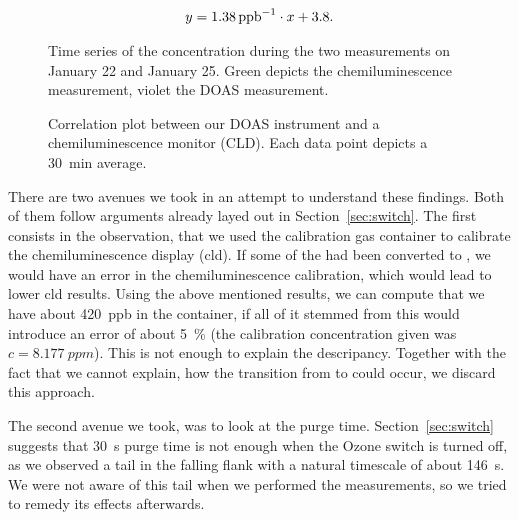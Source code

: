 \begin{align*}
  y = \SI{1.38}{{ppb}\tothe{-1}} \cdot x + 3.8.
\end{align*}

\begin{figure}[htbp]
  \centering
  
  \hfill
  
  \caption{Time series of the  concentration during the two
    measurements on January 22 and January 25. Green depicts the
    chemiluminescence measurement, violet the DOAS measurement.}
  \label{fig:corr-ts}
\end{figure}

\begin{figure}[htbp]
  \centering
  
  \caption{Correlation plot between our DOAS instrument and a
    chemiluminescence monitor (CLD). Each data point depicts a
    \SI{30}{\minute} average.}
  \label{fig:cld-corr}
\end{figure}

There are two avenues we took in an attempt to understand these
findings. Both of them follow arguments already layed out in
Section~\ref{sec:switch}. The first consists in the observation, that
we used the  calibration gas container to calibrate the
chemiluminescence display (cld). If some of the  had been converted
to , we would have an error in the chemiluminescence
calibration, which would lead to lower cld results. Using the above
mentioned results, we can compute that we have about \SI{420}{ppb}
 in the container, if all of it stemmed from  this
would introduce an error of about \SI{5}{\percent} (the calibration
concentration given was $c = \SI{8.177}{ppm}$). This is not enough to
explain the descripancy. Together with the fact that we cannot
explain, how the transition from  to  could occur, we
discard this approach.

The second avenue we took, was to look at the purge
time. Section~\ref{sec:switch} suggests that \SI{30}{\second} purge
time is not enough when the Ozone switch is turned off, as we observed
a tail in the falling flank with a natural timescale of about
\SI{146}{\second}. We were not aware of this tail when we performed
the measurements, so we tried to remedy its effects afterwards.


